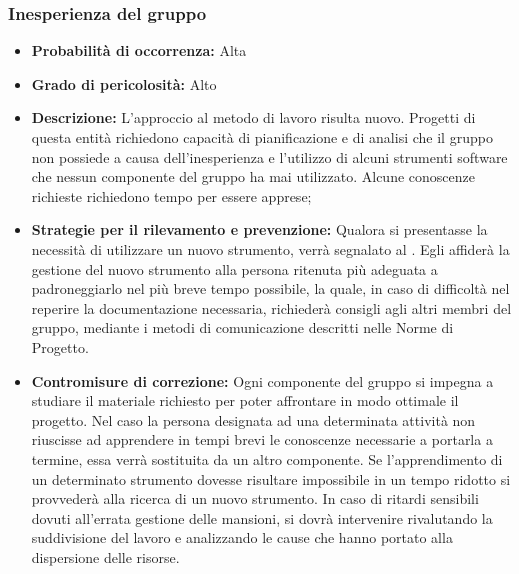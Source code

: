 \subsubsection{Inesperienza del gruppo}
\hypertarget{subsubsect:inesperienza}{}
\begin{itemize}
\item \textbf{Probabilità di occorrenza:} Alta
\item \textbf{Grado di pericolosità:} Alto
\item \textbf{Descrizione:} L'approccio al metodo di lavoro risulta nuovo. Progetti di questa entità richiedono capacità di pianificazione e di analisi che il gruppo non possiede a causa dell'inesperienza e l'utilizzo di alcuni strumenti software che nessun componente del gruppo ha mai utilizzato. Alcune conoscenze richieste richiedono tempo per essere apprese;

\item \textbf{Strategie per il rilevamento e prevenzione:} Qualora si presentasse la necessità di utilizzare un nuovo strumento, verrà segnalato al \ruoloResponsabile. Egli affiderà la gestione del nuovo strumento alla persona ritenuta più adeguata a padroneggiarlo nel più breve tempo possibile, la quale, in caso di difficoltà nel reperire la documentazione necessaria, richiederà consigli agli altri membri del gruppo, mediante i metodi di comunicazione descritti nelle Norme di Progetto. 

\item \textbf{Contromisure di correzione:} Ogni componente del gruppo si impegna a studiare il materiale richiesto per poter affrontare in modo ottimale il progetto. Nel caso la persona designata ad una determinata attività non riuscisse ad apprendere in tempi brevi le conoscenze necessarie a portarla a termine, essa verrà sostituita da un altro componente. Se l'apprendimento di un determinato strumento dovesse risultare impossibile in un tempo ridotto si provvederà alla ricerca di un nuovo strumento. In caso di ritardi sensibili dovuti all'errata gestione delle mansioni, si dovrà intervenire rivalutando la suddivisione
del lavoro e analizzando le cause che hanno portato alla dispersione delle risorse.
\end{itemize}


